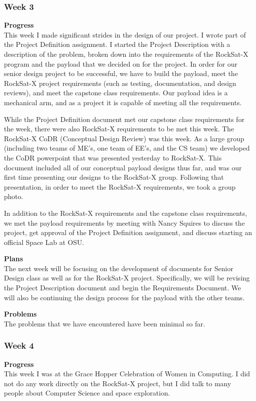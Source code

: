 \subsubsection{Week 3}
\textbf{Progress} \\
This week I made significant strides in the design of our project. I wrote part of the Project Definition assignment. I started the Project Description with a description of the problem, broken down into the requirements of the RockSat-X program and the payload that we decided on for the project. In order for our senior design project to be successful, we have to build the payload, meet the RockSat-X project requirements (such as testing, documentation, and design reviews), and meet the capstone class requirements. Our payload idea is a mechanical arm, and as a project it is capable of meeting all the requirements.

While the Project Definition document met our capstone class requirements for the week, there were also RockSat-X requirements to be met this week. The RockSat-X CoDR (Conceptual Design Review) was this week. As a large group (including two teams of ME's, one team of EE's, and the CS team) we developed the CoDR powerpoint that was presented yesterday to RockSat-X. This document included all of our conceptual payload designs thus far, and was our first time presenting our designs to the RockSat-X group. Following that presentation, in order to meet the RockSat-X requirements, we took a group photo.

In addition to the RockSat-X requirements and the capstone class requirements, we met the payload requirements by meeting with Nancy Squires to discuss the project, get approval of the Project Definition assignment, and discuss starting an official Space Lab at OSU.

\textbf{Plans} \\
The next week will be focusing on the development of documents for Senior Design class as well as for the RockSat-X project. Specifically, we will be revising the Project Description document and begin the Requirements Document. We will also be continuing the design process for the payload with the other teams.

\textbf{Problems} \\
The problems that we have encountered have been minimal so far.

\subsubsection{Week 4}
\textbf{Progress} \\
This week I was at the Grace Hopper Celebration of Women in Computing. I did not do any work directly on the RockSat-X project, but I did talk to many people about Computer Science and space exploration.

